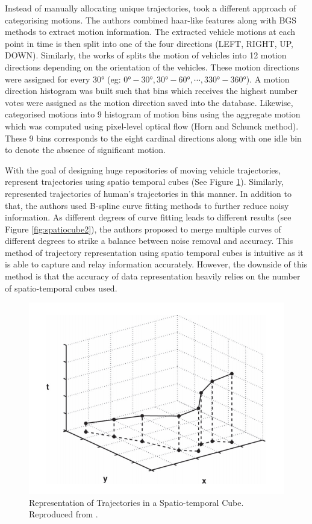 Instead of manually allocating unique trajectories,  took a different approach of categorising motions. The authors combined haar-like features along with BGS methods to extract motion information. The extracted vehicle motions at each point in time is then split into one of the four directions (LEFT, RIGHT, UP, DOWN). Similarly, the works of  splits the motion of vehicles into 12 motion directions depending on the orientation of the vehicles. These motion directions were assigned for every $\ang{30}$ (eg: $\ang{0}-\ang{30}, \ang{30}-\ang{60}, \cdots, \ang{330}-\ang{360}$). A motion direction histogram was built such that bins which receives the highest number votes were assigned as the motion direction saved into the database. Likewise,  categorised motions into 9 histogram of motion bins using the aggregate motion which was computed using pixel-level optical flow (Horn and Schunck method). These 9 bins corresponds to the eight cardinal directions along with one idle bin to denote the absence of significant motion.


With the goal of designing huge repositories of moving vehicle trajectories,  represent trajectories using spatio temporal cubes (See Figure \ref{fig:spatiocube}). 
Similarly,  represented trajectories of human's trajectories in this manner. In addition to that, the authors used B-spline curve fitting methods to further reduce noisy information. As different degrees of curve fitting leads to different results (see Figure \ref{fig:spatiocube2}), the authors proposed to merge multiple curves of different degrees to strike a balance between noise removal and accuracy.
This method of trajectory representation using spatio temporal cubes is intuitive as it is able to capture and relay information accurately. 
However, the downside of this method is that the accuracy of data representation heavily relies on the number of spatio-temporal cubes used. 

\begin{figure}[hbt!]\centering
\includegraphics[width=.5\textwidth]{image/lit/spatiotemporal.PNG}
\caption[Representation of Trajectories in a Spatio-temporal Cube.]
{Representation of Trajectories in a Spatio-temporal Cube.
Reproduced from .}
\label{fig:spatiocube}
\end{figure}

